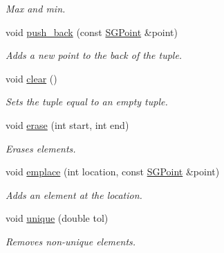 \begin{DoxyCompactItemize}
\begin{DoxyCompactList}\small\item\em Max and min. \end{DoxyCompactList}\item 
\mbox{\label{classSGTuple_a5aae68fc99fd77e346ee712b634fc358}} 
void \hyperlink{classSGTuple_a5aae68fc99fd77e346ee712b634fc358}{push\+\_\+back} (const \hyperlink{classSGPoint}{S\+G\+Point} \&point)
\begin{DoxyCompactList}\small\item\em Adds a new point to the back of the tuple. \end{DoxyCompactList}\item 
\mbox{\label{classSGTuple_a5eec252277fa0f1007ce54dec61a6cdb}} 
void \hyperlink{classSGTuple_a5eec252277fa0f1007ce54dec61a6cdb}{clear} ()
\begin{DoxyCompactList}\small\item\em Sets the tuple equal to an empty tuple. \end{DoxyCompactList}\item 
\mbox{\label{classSGTuple_ab25851a8056fad3f0ade6929230e7cc9}} 
void \hyperlink{classSGTuple_ab25851a8056fad3f0ade6929230e7cc9}{erase} (int start, int end)
\begin{DoxyCompactList}\small\item\em Erases elements. \end{DoxyCompactList}\item 
\mbox{\label{classSGTuple_ab126c10a2f01cf27f9e41167c4a200b0}} 
void \hyperlink{classSGTuple_ab126c10a2f01cf27f9e41167c4a200b0}{emplace} (int location, const \hyperlink{classSGPoint}{S\+G\+Point} \&point)
\begin{DoxyCompactList}\small\item\em Adds an element at the location. \end{DoxyCompactList}\item 
\mbox{\label{classSGTuple_a1868a0be39ce36c14fccdde474623216}} 
void \hyperlink{classSGTuple_a1868a0be39ce36c14fccdde474623216}{unique} (double tol)
\begin{DoxyCompactList}\small\item\em Removes non-\/unique elements. \end{DoxyCompactList}\item 

\end{DoxyCompactItemize}
